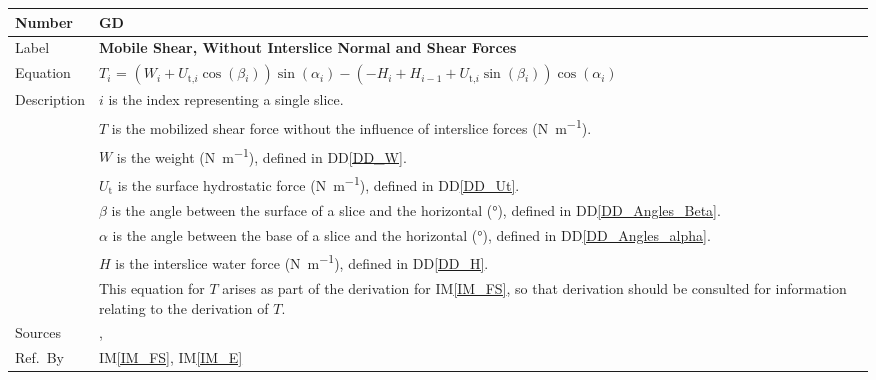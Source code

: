 \documentclass[12pt]{article}
\newcommand{\colAwidth}{0.13\textwidth}
\newcommand{\colBwidth}{0.82\textwidth}
\renewcommand{\arraystretch}{1}
\newcommand{\iref}[1]{IM\ref{#1}}
\newcommand{\ddref}[1]{DD\ref{#1}}
\newcounter{defnum} %
\begin{document}
\noindent
\begin{minipage}{\textwidth}
	\renewcommand*{\arraystretch}{1.5}
	\begin{tabular}{| p{\colAwidth} | p{\colBwidth} |}
		
		\hline
		\rowcolor[gray]{0.9}
		Number& GD{defnum}\thedefnum \label{GD_T}\\
		
		\hline
		Label& \bf Mobile Shear, Without Interslice Normal and Shear Forces \\
		
		\hline
		Equation &
		$T_i$ = 
		$\left(W_{i}+{U_{\text{t,}i}}\cos\left(\beta{}_{i}\right)\right)\sin\left(\alpha{}_{i}
		\right)-\left(- H_{i} + H_{i-1} 
		+{U_{\text{t,}i}}\sin\left(\beta{}_{i}\right)
		\right)\cos\left(\alpha{}_{i}\right)$
		\\ 
		
		\hline Description &$i$ is the index representing a single slice.\\ 
		&$T$ is the mobilized shear force without the influence of interslice 
		forces (\si{\newton\per\meter}).\\
		&$W$ is the weight (\si{\newton\per\meter}), defined in \ddref{DD_W}.\\
		&${U_{\text{t}}}$ is the surface hydrostatic force 
		(\si{\newton\per\meter}), defined in \ddref{DD_Ut}.\\ 
		&$\beta{}$ is the angle between the surface of a slice and the 
		horizontal (\si{\degree}), defined in \ddref{DD_Angles_Beta}.\\
		&$\alpha{}$ is the angle between the base of a slice and the horizontal 
		(\si{\degree}), defined in \ddref{DD_Angles_alpha}.\\
		&$H$ is the interslice water force (\si{\newton\per\meter}), defined in 
		\ddref{DD_H}.\\
		&This equation for $T$ arises as part of the derivation for 
		\iref{IM_FS}, so that derivation should be consulted for information 
		relating to the derivation of $T$.\\
		
		\hline
		Sources& \cite{ZhuEtAl2005}, \cite{Karchewski2012}\\
		
		\hline Ref.\ By & \iref{IM_FS}, \iref{IM_E}\\
		
		\hline
	\end{tabular}
\end{minipage}\\
\end{document}
